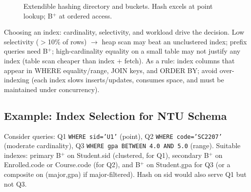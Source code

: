 \begin{figure}[h]
\centering
{}
\caption{Extendible hashing directory and buckets. Hash excels at point lookup; B$^+$ at ordered access.}
\label{fig:hash}
\end{figure}

Choosing an index: cardinality, selectivity, and workload drive the decision. Low selectivity ($>$10\% of rows) $\to$ heap scan may beat an unclustered index; prefix queries need B$^+$; high-cardinality equality on a small table may not justify any index (table scan cheaper than index + fetch). As a rule: index columns that appear in WHERE equality/range, JOIN keys, and ORDER BY; avoid over-indexing (each index slows inserts/updates, consumes space, and must be maintained under concurrency).

\subsection{Example: Index Selection for NTU Schema}

Consider queries: Q1 \texttt{WHERE sid='U1'} (point), Q2 \texttt{WHERE code='SC2207'} (moderate cardinality), Q3 \texttt{WHERE gpa BETWEEN 4.0 AND 5.0} (range). Suitable indexes: primary B$^+$ on Student.sid (clustered, for Q1), secondary B$^+$ on Enrolled.code or Course.code (for Q2), and B$^+$ on Student.gpa for Q3 (or a composite on (major,gpa) if major-filtered). Hash on sid would also serve Q1 but not Q3.


